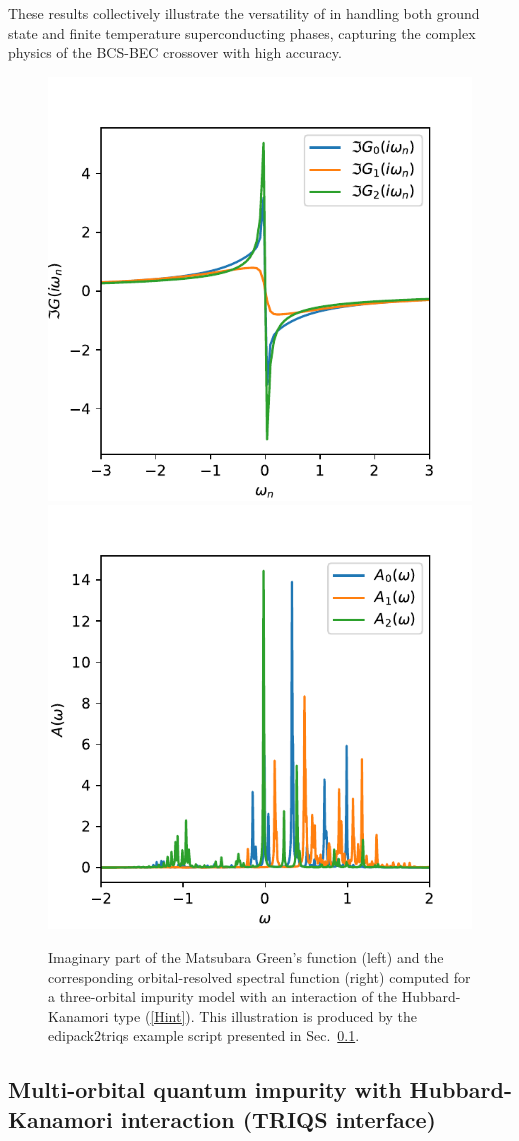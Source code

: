 \documentclass[edipack2.tex]{subfiles}
\begin{document}
These results collectively illustrate the versatility of \NAME in 
handling both ground state and finite temperature superconducting 
phases, capturing the complex physics of the BCS-BEC crossover with 
high accuracy.














\begin{figure}[t!]
    \includegraphics[width=0.5\linewidth]
        {edipack2_examples/edipack2triqs/G_iw.pdf}
    \includegraphics[width=0.5\linewidth]
        {edipack2_examples/edipack2triqs/A_w.pdf}
    \caption{\label{figEx3}%
        Imaginary part of the Matsubara Green's function (left) and the
        corresponding orbital-resolved spectral function (right) computed for a
        three-orbital impurity model with an interaction of the Hubbard-Kanamori
        type (\ref{Hint}). This illustration is produced by the edipack2triqs
        example script presented in Sec.~\ref{SecExamplesTRIQS}.
    }
\end{figure}

\subsection{Multi-orbital quantum impurity with Hubbard-Kanamori
  interaction (TRIQS interface)}
\label{SecExamplesTRIQS}
\end{document}
